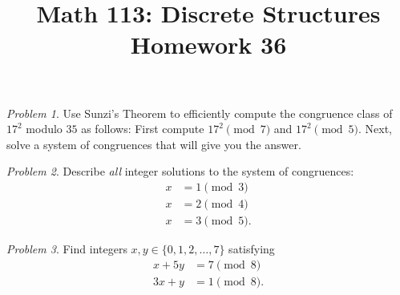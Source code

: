 \documentclass[11pt,twoside]{amsart}
\title{Math 113: Discrete Structures\\ Homework 36}
\theoremstyle{plain}
\theoremstyle{remark}
\newtheorem{prob}{Problem}
\theoremstyle{definition}
\theoremstyle{definition}
\begin{document}
\maketitle


\begin{prob}
Use Sunzi's Theorem to efficiently compute the congruence class of $17^2$ modulo
$35$ as follows:  First compute $17^2\pmod 7$ and $17^2\pmod 5$.  Next, solve a system of congruences that will give you the answer.\end{prob}

\begin{prob}
  Describe \emph{all} integer solutions to the system of congruences:
  \begin{align*}
    x&=1\pmod 3\\
    x&=2\pmod 4\\
    x&=3\pmod 5.
  \end{align*}
\end{prob}

\begin{prob}
  Find integers $x,y\in \{0,1,2,\ldots,7\}$ satisfying
  \begin{align*}
    x+5y&=7\pmod 8\\
    3x+y&=1\pmod 8.
  \end{align*}
\end{prob}
\end{document}
